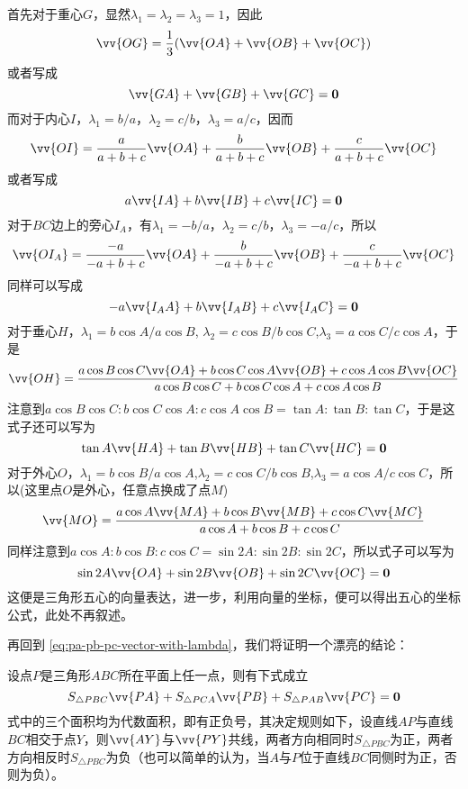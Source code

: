 \begin{example}
 首先对于重心$G$，显然$\lambda_1=\lambda_2=\lambda_3=1$，因此
 \[ \vv{OG} = \frac{1}{3} (\vv{OA} + \vv{OB} + \vv{OC}) \]
 或者写成
 \[ \vv{GA} + \vv{GB} + \vv{GC} = \bm{0} \]
 而对于内心$I$，$\lambda_1 = b/a$，$\lambda_2=c/b$，$\lambda_3=a/c$，因而
 \[ \vv{OI} = \frac{a}{a+b+c} \vv{OA} + \frac{b}{a+b+c} \vv{OB} + \frac{c}{a+b+c} \vv{OC} \]
 或者写成
 \[ a\vv{IA} + b \vv{IB} + c\vv{IC} = \bm{0} \]
 对于$BC$边上的旁心$I_A$，有$\lambda_1=-b/a$，$\lambda_2=c/b$，$\lambda_3=-a/c$，所以
 \[ \vv{OI_A} = \frac{-a}{-a+b+c} \vv{OA} + \frac{b}{-a+b+c} \vv{OB} + \frac{c}{-a+b+c} \vv{OC} \]
 同样可以写成
 \[ -a \vv{I_AA} + b \vv{I_AB} + c\vv{I_AC} = \bm{0} \]
 对于垂心$H$，$\lambda_1=b\cos{A}/a\cos{B}$, $\lambda_2=c\cos{B}/b\cos{C}$,$\lambda_3=a\cos{C}/c\cos{A}$，于是
 \[ \vv{OH} = \frac{a \cos{B}\cos{C} \vv{OA} + b \cos{C}\cos{A} \vv{OB} + c \cos{A}\cos{B} \vv{OC}}{a\cos{B}\cos{C}+b\cos{C}\cos{A}+c\cos{A}\cos{B}} \]
 注意到$a \cos{B}\cos{C} : b \cos{C}\cos{A} : c \cos{A}\cos{B} = \tan{A} : \tan{B} : \tan{C}$，于是这式子还可以写为
 \[ \tan{A} \vv{HA} + \tan{B} \vv{HB} + \tan{C} \vv{HC} = \bm{0} \]
 对于外心$O$，$\lambda_1=b\cos{B}/a\cos{A}$,$\lambda_2=c\cos{C}/b\cos{B}$,$\lambda_3=a\cos{A}/c\cos{C}$，所以(这里点$O$是外心，任意点换成了点$M$)
 \[ \vv{MO} = \frac{a\cos{A}\vv{MA}+b\cos{B}\vv{MB}+c\cos{C}\vv{MC}}{a\cos{A}+b\cos{B}+c\cos{C}} \]
 同样注意到$a\cos{A} : b\cos{B} : c\cos{C} = \sin{2A} : \sin{2B} : \sin{2C}$，所以式子可以写为
 \[ \sin{2A} \vv{OA} + \sin{2B} \vv{OB} + \sin{2C} \vv{OC} = \bm{0} \]
 这便是三角形五心的向量表达，进一步，利用向量的坐标，便可以得出五心的坐标公式，此处不再叙述。

 再回到 \autoref{eq:pa-pb-pc-vector-with-lambda}，我们将证明一个漂亮的结论：
 \begin{theorem}
   \label{theorem:vector-equation-for-point-about-triangle}
   设点$P$是三角形$ABC$所在平面上任一点，则有下式成立
   \begin{equation}
     \label{eq:vector-equation-for-point-about-triangle}
     S_{\triangle PBC}\vv{PA}+S_{\triangle PCA} \vv{PB} + S_{\triangle PAB} \vv{PC}=\bm{0}
   \end{equation}
     式中的三个面积均为代数面积，即有正负号，其决定规则如下，设直线$AP$与直线$BC$相交于点$Y$，则$\vv{AY}$与$\vv{PY}$共线，两者方向相同时$S_{\triangle PBC}$为正，两者方向相反时$S_{\triangle PBC}$为负（也可以简单的认为，当$A$与$P$位于直线$BC$同侧时为正，否则为负）。
 \end{theorem}


\end{example}
